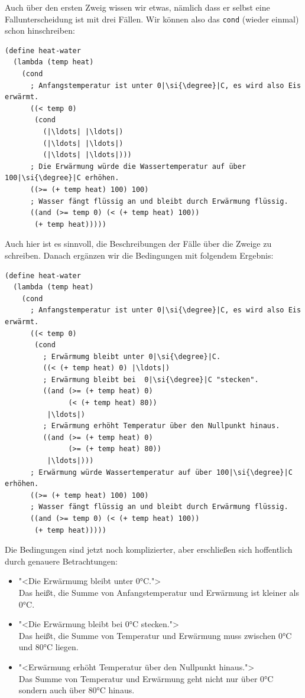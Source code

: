 \mantraschreib*
%
\noindent Auch über den ersten Zweig wissen wir etwas, nämlich dass er selbst
eine Fallunterscheidung ist mit drei Fällen.  Wir können also das
\lstinline{cond} (wieder einmal) schon hinschreiben:
%
\begin{lstlisting}
(define heat-water
  (lambda (temp heat)
    (cond
      ; Anfangstemperatur ist unter 0|\si{\degree}|C, es wird also Eis erwärmt.
      ((< temp 0)
       (cond
         (|\ldots| |\ldots|)
         (|\ldots| |\ldots|)
         (|\ldots| |\ldots|)))
      ; Die Erwärmung würde die Wassertemperatur auf über 100|\si{\degree}|C erhöhen.
      ((>= (+ temp heat) 100) 100)
      ; Wasser fängt flüssig an und bleibt durch Erwärmung flüssig.
      ((and (>= temp 0) (< (+ temp heat) 100))
       (+ temp heat)))))
\end{lstlisting}
%
Auch hier ist es sinnvoll, die Beschreibungen der Fälle über die
Zweige zu schreiben.  Danach ergänzen wir die Bedingungen mit
folgendem Ergebnis:
%
\begin{lstlisting}
(define heat-water
  (lambda (temp heat)
    (cond
      ; Anfangstemperatur ist unter 0|\si{\degree}|C, es wird also Eis erwärmt.
      ((< temp 0)
       (cond
         ; Erwärmumg bleibt unter 0|\si{\degree}|C.
         ((< (+ temp heat) 0) |\ldots|)
         ; Erwärmung bleibt bei  0|\si{\degree}|C "stecken".
         ((and (>= (+ temp heat) 0)
               (< (+ temp heat) 80))
          |\ldots|)
         ; Erwärmung erhöht Temperatur über den Nullpunkt hinaus.
         ((and (>= (+ temp heat) 0)
               (>= (+ temp heat) 80))
          |\ldots|)))
      ; Erwärmung würde Wassertemperatur auf über 100|\si{\degree}|C erhöhen.
      ((>= (+ temp heat) 100) 100)
      ; Wasser fängt flüssig an und bleibt durch Erwärmung flüssig.
      ((and (>= temp 0) (< (+ temp heat) 100))
       (+ temp heat)))))
\end{lstlisting}
%
Die Bedingungen sind jetzt noch komplizierter, aber erschließen sich
hoffentlich durch genauere Betrachtungen:
%
\begin{itemize}
\item "<Die Erwärmumg bleibt unter 0\si{\degree}C.">\\
  Das heißt, die Summe von
  Anfangstemperatur und Erwärmung ist kleiner als 0\si{\degree}C.
\item "<Die Erwärmung bleibt bei  0\si{\degree}C stecken.">\\
  Das heißt, die Summe von Temperatur und Erwärmung muss zwischen 0\si{\degree}C
  und 80\si{\degree}C liegen.
\item "<Erwärmung erhöht Temperatur über den Nullpunkt hinaus.">\\
  Das Summe von Temperatur und Erwärmung geht nicht nur über 0\si{\degree}C
  sondern auch über 80\si{\degree}C hinaus.
\end{itemize}
